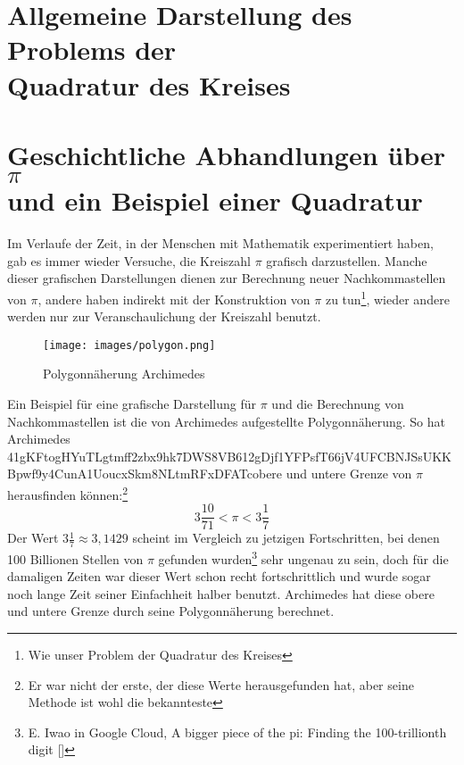 \documentclass[11pt]{article}
\begin{document}
\maketitle

\newpage
\tableofcontents
\newpage
\section{Allgemeine Darstellung des Problems der\\ Quadratur des Kreises}


\newpage
\section{Geschichtliche Abhandlungen über $\pi$ \\und ein Beispiel einer Quadratur}
\onehalfspace
Im Verlaufe der Zeit, in der Menschen mit Mathematik experimentiert haben, gab es immer wieder Versuche, die Kreiszahl \(\pi\) grafisch darzustellen. Manche dieser grafischen Darstellungen dienen zur Berechnung neuer Nachkommastellen von $\pi$, andere haben indirekt mit der Konstruktion von $\pi$ zu tun\footnote{Wie unser Problem der Quadratur des Kreises}, wieder andere werden nur zur Veranschaulichung der Kreiszahl benutzt.\newline \begin{wrapfigure}{r}{0.3 \textwidth}\centering\texttt{[image: images/polygon.png]}\caption{Polygonnäherung Archimedes}\label{archimed:approx}\end{wrapfigure}\par Ein Beispiel für eine grafische Darstellung für $\pi$ und die Berechnung von Nachkommastellen ist die von Archimedes aufgestellte Polygonnäherung. So hat Archimedes 41gKFtogHYuTLgtmff2zbx9hk7DWS8VB612gDjf1YFPsfT66jV4UFCBNJSsUKKBpwf9y4CunA1UoucxSkm8NLtmRFxDFATcobere und untere Grenze von \(\pi\) herausfinden können:\footnote{Er war nicht der erste, der diese Werte herausgefunden hat, aber seine Methode ist wohl die bekannteste}
\[3 \frac{10}{71}<\pi<3 \frac{1}{7}\]
Der Wert \(3 \frac{1}{7}\approx3,1429\) scheint im Vergleich zu jetzigen Fortschritten, bei denen 100 Billionen Stellen von \(\pi\) gefunden wurden\footnote{E. Iwao in Google Cloud, A bigger piece of the pi: Finding the 100-trillionth digit [\GoogleCloudInt]} sehr ungenau zu sein, doch für die damaligen Zeiten war dieser Wert schon recht fortschrittlich und wurde sogar noch lange Zeit seiner Einfachheit halber benutzt. Archimedes hat diese obere und untere Grenze durch seine Polygonnäherung berechnet.
\end{document}
